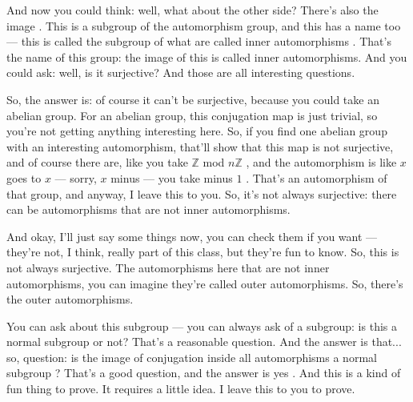 \begin{speech}[00:26:54 - 00:29:09]
And now you could think: well, what about the other side? There's also the image . This is a subgroup of the automorphism group, and this has a name too --- this is called the subgroup of what are called inner automorphisms . That's the name of this group: the image of this is called inner automorphisms. And you could ask: well, is it surjective? And those are all interesting questions.

So, the answer is: of course it can't be surjective, because you could take an abelian group. For an abelian group, this conjugation map is just trivial, so you're not getting anything interesting here. So, if you find one abelian group with an interesting automorphism, that'll show that this map is not surjective, and of course there are, like you take $\mathbb{Z}$ mod $n\mathbb{Z}$ , and the automorphism is like $x$ goes to $x$ --- sorry, $x$ minus --- you take minus $1$ . That's an automorphism of that group, and anyway, I leave this to you. So, it's not always surjective: there can be automorphisms that are not inner automorphisms.

And okay, I'll just say some things now, you can check them if you want --- they're not, I think, really part of this class, but they're fun to know. So, this is not always surjective. The automorphisms here that are not inner automorphisms, you can imagine they're called outer automorphisms. So, there's the outer automorphisms.

You can ask about this subgroup --- you can always ask of a subgroup: is this a normal subgroup or not? That's a reasonable question. And the answer is that... so, question: is the image of conjugation inside all automorphisms a normal subgroup ? That's a good question, and the answer is yes . And this is a kind of fun thing to prove. It requires a little idea. I leave this to you to prove.
\end{speech}


